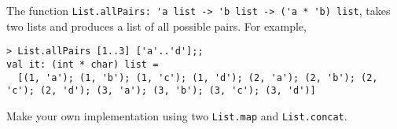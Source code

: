 The function \mbox{\lstinline{List.allPairs: 'a list -> 'b list -> ('a * 'b) list}}, takes two lists and produces a list of all possible pairs. For example,
\begin{lstlisting}
> List.allPairs [1..3] ['a'..'d'];;
val it: (int * char) list =
  [(1, 'a'); (1, 'b'); (1, 'c'); (1, 'd'); (2, 'a'); (2, 'b'); (2, 'c'); (2, 'd'); (3, 'a'); (3, 'b'); (3, 'c'); (3, 'd')]
\end{lstlisting}
Make your own implementation using two \lstinline{List.map} and \lstinline{List.concat}.
